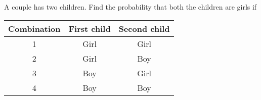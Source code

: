 
%
%
%
%
% 
% 

\question \begin{fullwidth} A couple has two children. Find the probability that both 
the children are girls if \end{fullwidth}

\insertQR{}

\ifprintanswers
  \begin{table}
  	\begin{tabular}{ccc}
  	   \toprule
  	   Combination & First child & Second child \\
  	   \midrule
  	   1 & Girl & Girl \\
  	   2 & Girl & Boy \\
  	   3 & Boy & Girl \\
  	   4 & Boy & Boy \\
  	   \bottomrule
  	\end{tabular}
  \end{table}
\fi 

